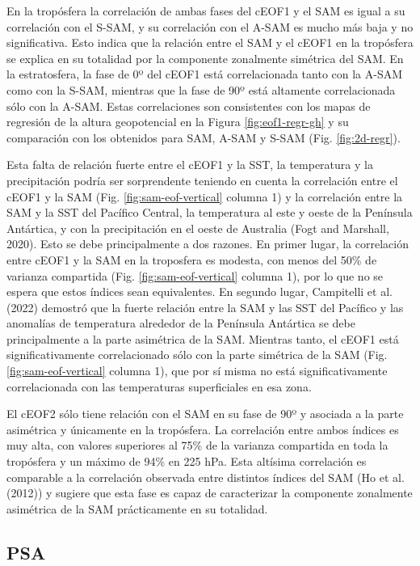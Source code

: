 \documentclass[12pt,oneside]{reedthesis}
\begin{document}
En la tropósfera la correlación de ambas fases del cEOF1 y el SAM es igual a su correlación con el S-SAM, y su correlación con el A-SAM es mucho más baja y no significativa.
Esto indica que la relación entre el SAM y el cEOF1 en la tropósfera se explica en su totalidad por la componente zonalmente simétrica del SAM.
En la estratosfera, la fase de 0º del cEOF1 está correlacionada tanto con la A-SAM como con la S-SAM, mientras que la fase de 90º está altamente correlacionada sólo con la A-SAM.
Estas correlaciones son consistentes con los mapas de regresión de la altura geopotencial en la Figura \ref{fig:eof1-regr-gh} y su comparación con los obtenidos para SAM, A-SAM y S-SAM (Fig. \ref{fig:2d-regr}).

Esta falta de relación fuerte entre el cEOF1 y la SST, la temperatura y la precipitación podría ser sorprendente teniendo en cuenta la correlación entre el cEOF1 y la SAM (Fig. \ref{fig:sam-eof-vertical} columna 1) y la correlación entre la SAM y la SST del Pacífico Central, la temperatura al este y oeste de la Península Antártica, y con la precipitación en el oeste de Australia (Fogt and Marshall, 2020).
Esto se debe principalmente a dos razones.
En primer lugar, la correlación entre cEOF1 y la SAM en la troposfera es modesta, con menos del 50\% de varianza compartida (Fig. \ref{fig:sam-eof-vertical} columna 1), por lo que no se espera que estos índices sean equivalentes.
En segundo lugar, Campitelli et al. (2022) demostró que la fuerte relación entre la SAM y las SST del Pacífico y las anomalías de temperatura alrededor de la Península Antártica se debe principalmente a la parte asimétrica de la SAM.
Mientras tanto, el cEOF1 está significativamente correlacionado sólo con la parte simétrica de la SAM (Fig. \ref{fig:sam-eof-vertical} columna 1), que por sí misma no está significativamente correlacionada con las temperaturas superficiales en esa zona.

El cEOF2 sólo tiene relación con el SAM en su fase de 90º y asociada a la parte asimétrica y únicamente en la tropósfera.
La correlación entre ambos índices es muy alta, con valores superiores al 75\% de la varianza compartida en toda la tropósfera y un máximo de 94\% en 225 hPa.
Esta altísima correlación es comparable a la correlación observada entre distintos índices del SAM (Ho et al. (2012)) y sugiere que esta fase es capaz de caracterizar la componente zonalmente asimétrica de la SAM prácticamente en su totalidad.

\hypertarget{psa}{%
\subsection{PSA}\label{psa}}
\end{document}
